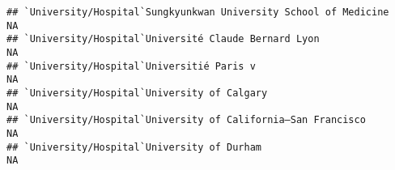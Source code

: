 \documentclass[]{article}
\begin{document}
\begin{verbatim}
## `University/Hospital`Sungkyunkwan University School of Medicine                                                                                                                                                                                                                                                                                                                                                                                                                       NA
## `University/Hospital`Université Claude Bernard Lyon                                                                                                                                                                                                                                                                                                                                                                                                                                   NA
## `University/Hospital`Universitié Paris v                                                                                                                                                                                                                                                                                                                                                                                                                                              NA
## `University/Hospital`University of Calgary                                                                                                                                                                                                                                                                                                                                                                                                                                            NA
## `University/Hospital`University of California–San Francisco                                                                                                                                                                                                                                                                                                                                                                                                                           NA
## `University/Hospital`University of Durham                                                                                                                                                                                                                                                                                                                                                                                                                                             NA

\end{verbatim}
\end{document}
